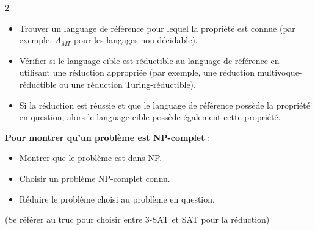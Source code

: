 \documentclass[11pt]{article}
\begin{document}
\begin{multicols}{2}
\begin{itemize}[noitemsep]
  \item Trouver un language de référence pour lequel la propriété est connue (par exemple, $A_{MT}$ pour les langages non décidable).
  \item Vérifier si le language cible est réductible au language de référence en utilisant une réduction appropriée (par exemple, une réduction multivoque-réductible ou une réduction Turing-réductible).
  \item Si la réduction est réussie et que le language de référence possède la propriété en question, alors le language cible possède également cette propriété.
\end{itemize}
\textbf{Pour montrer qu'un problème est NP-complet} : 
\begin{itemize}[noitemsep]
  \item Montrer que le problème est dans NP.
  \item Choisir un problème NP-complet connu.
  \item Réduire le problème choisi au problème en question.
\end{itemize}
(Se référer au truc pour choisir entre 3-SAT et SAT pour la réduction)
\end{multicols}
\end{document}
